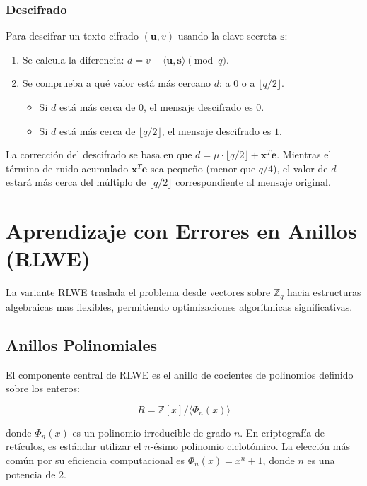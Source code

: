 \subsubsection{Descifrado}
Para descifrar un texto cifrado $(\mathbf{u}, v)$ usando la clave secreta $\mathbf{s}$:
\begin{enumerate}
    \item Se calcula la diferencia: $d = v - \langle \mathbf{u}, \mathbf{s} \rangle \pmod{q}$.
    \item Se comprueba a qué valor está más cercano $d$: a $0$ o a $\lfloor q/2 \rfloor$.
    \begin{itemize}
        \item Si $d$ está más cerca de $0$, el mensaje descifrado es $0$.
        \item Si $d$ está más cerca de $\lfloor q/2 \rfloor$, el mensaje descifrado es $1$.
    \end{itemize}
\end{enumerate}
La corrección del descifrado se basa en que $d = \mu \cdot \lfloor q/2 \rfloor + \mathbf{x}^T\mathbf{e}$. Mientras el término de ruido acumulado $\mathbf{x}^T\mathbf{e}$ sea pequeño (menor que $q/4$), el valor de $d$ estará más cerca del múltiplo de $\lfloor q/2 \rfloor$ correspondiente al mensaje original.

\section{Aprendizaje con Errores en Anillos (RLWE)}

La variante RLWE \cite{LPR10} traslada el problema desde vectores sobre $\mathbb{Z}_q$ hacia estructuras algebraicas mas flexibles, permitiendo optimizaciones algorítmicas significativas.

\subsection{Anillos Polinomiales}

El componente central de RLWE es el anillo de cocientes de polinomios definido sobre los enteros:

\[ R = \mathbb{Z}[x] / \langle \Phi_n(x) \rangle \]

donde $\Phi_n(x)$ es un polinomio irreducible de grado $n$. En criptografía de retículos, es estándar utilizar el $n$-ésimo polinomio ciclotómico. La elección más común por su eficiencia computacional es $\Phi_n(x) = x^n + 1$, donde $n$ es una potencia de 2.

